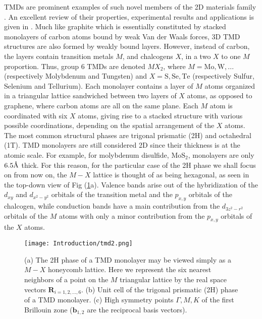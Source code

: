 \acp{TMD} are prominent examples of such novel members of the \ac{2D} materials family \cite{wang_electronics_2012, roldan_electronic_2014, xu_spin_2014}.
An excellent review of their properties, experimental results and applications is given in \cite{manzeli_2d_2017}.
Much like graphite which is essentially constituted by stacked monolayers of carbon atoms bound by weak Van der Waals forces, 3D \ac{TMD} structures are also formed by weakly bound layers.
However, instead of carbon, the layers contain transition metals $M$, and chalcogens $X$, in a two $X$ to one $M$ proportion.
Thus, group 6 \acp{TMD} are denoted $MX_2$, where $M = \text{Mo}, \text{W}, ...$ (respectively Molybdenum and Tungsten) and $X = \text{S}, \text{Se}, \text{Te}$ (respectively Sulfur, Selenium and Tellurium).
Each monolayer contains a layer of $M$ atoms organized in a triangular lattice sandwiched between two layers of $X$ atoms, as opposed to graphene, where carbon atoms are all on the same plane.
Each $M$ atom is coordinated with six $X$ atoms, giving rise to a stacked structure with various possible coordinations, depending on the spatial arrangement of the $X$ atoms.
The most common structural phases are trigonal prismatic (2H) and octahedral (1T).
\ac{TMD} monolayers are still considered \ac{2D} since their thickness is at the atomic scale.
For example, for molybdenum disulfide, $\text{Mo} \text{S}_2$, monolayers are only $ 6.5 \textup{\AA}$ thick.
For this reason, for the particular case of the 2H phase we shall focus on from now on, the $M-X$ lattice is thought of as being hexagonal, as seen in the top-down view of Fig (\ref{fig:tmdHex}a).
Valence bands arise out of the hybridization of the $d_{xy}$ and $d_{x^2 - y^2}$ orbitals of the transition metal and the $p_{x, y}$ orbitals of the chalcogen, while conduction bands have a main contribution from the $d_{3z^2 - r^2}$ orbitals of the $M$ atoms with only a minor contribution from the $p_{x, y}$ orbitals of the $X$ atoms.

\begin{figure}[H]
\centering
\texttt{[image: Introduction/tmd2.png]}
 \caption[\ac{TMD} monolayer condensing in its 2H phase.
 $M-X$ honeycomb lattice.
 Unit cell of the trigonal prismatic (2H) phase of a \ac{TMD} monolayer.
 High symmetry points of the corresponding hexagonal lattice's  reciprocal space.]{(a) The 2H phase of a  \ac{TMD} monolayer may be viewed simply as a $M-X$ honeycomb lattice. Here we represent the six nearest neighbors of a point on the $M$ triangular lattice by the real space vectors $\bm R_{i = 1,2,..., 6}$.
(b) Unit cell of the trigonal prismatic (2H) phase of a \ac{TMD} monolayer.
(c) High symmetry points $\Gamma, M, K$ of the first Brillouin zone ($\bm b_{1,2}$ are the reciprocal basis vectors).\label{fig:tmdHex}}
\end{figure}

